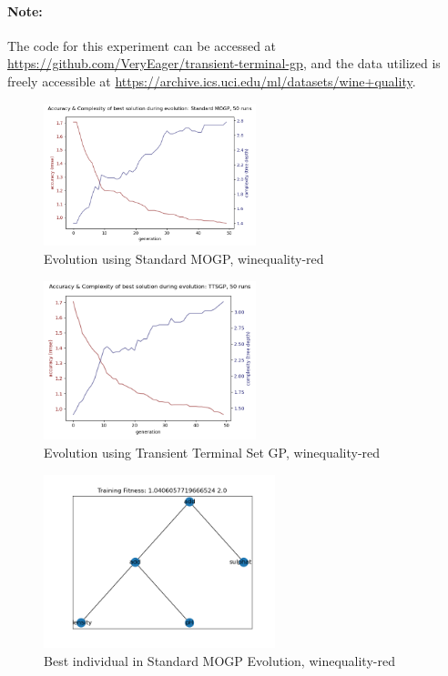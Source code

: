 \documentclass[a4paper]{article}
\begin{document}
\paragraph{Note:} The code for this experiment can be accessed at \url{https://github.com/VeryEager/transient-terminal-gp}, and the data utilized is freely accessible at \url{https://archive.ics.uci.edu/ml/datasets/wine+quality}.
\begin{figure}[H]
	\caption{Evolution using Standard MOGP, winequality-red}
	\centering
	\includegraphics[width=0.55\textwidth]{redwine-sgp-evo}
\end{figure}
\begin{figure}[H]
	\caption{Evolution using Transient Terminal Set GP, winequality-red}
	\centering
	\includegraphics[width=0.55\textwidth]{redwine-ttgp-evo}
\end{figure}
\begin{figure}[H]
	\caption{Best individual in Standard MOGP Evolution, winequality-red}
	\centering
	\includegraphics[width=0.6\textwidth]{redwine-sgp-ex}
\end{figure}
\end{document}
